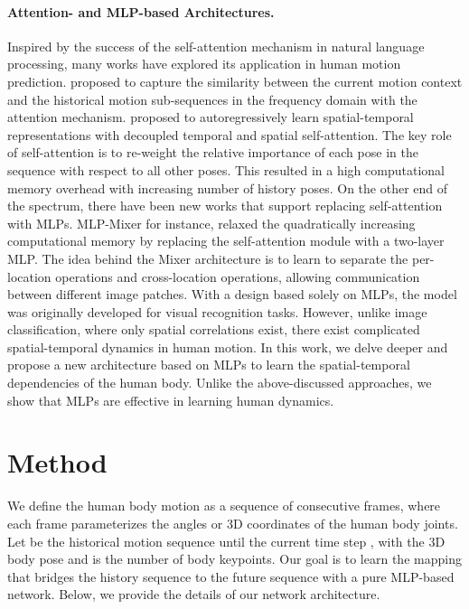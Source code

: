 \documentclass{article}
\begin{document}
\paragraph{Attention- and MLP-based Architectures.}
Inspired by the success of the self-attention mechanism \cite{vaswani2017attention} in natural language processing, many works have explored its application in human motion prediction. \cite{mao2020history} proposed to capture the similarity between the current motion context and the historical motion sub-sequences in the frequency domain with the attention mechanism. \cite{aksan2020spatio} proposed to autoregressively learn spatial-temporal representations with  decoupled temporal and spatial self-attention. The key role of self-attention is to re-weight the relative importance of each pose in the sequence with respect to all other poses. This resulted in a high computational memory overhead with increasing number of history poses. On the other end of the spectrum, there have been new works that support replacing self-attention with MLPs. MLP-Mixer  \cite{tolstikhin2021mlp} for instance, relaxed the quadratically increasing computational memory by replacing the self-attention module with a two-layer MLP. The idea behind the Mixer architecture is to learn to separate the per-location operations and cross-location operations, allowing communication between different image patches. With a design based solely on MLPs, the model was originally developed for visual recognition tasks. However, unlike image classification, where only spatial correlations exist, there exist complicated spatial-temporal dynamics in human motion. In this work, we delve deeper and propose a new architecture based on MLPs to learn the spatial-temporal dependencies of the human body. Unlike the above-discussed approaches, we show that MLPs are effective in learning human dynamics. 

\section {Method}

We define the human body motion as a sequence of  consecutive frames, where each frame parameterizes the angles or 3D coordinates of the human body joints. Let  be the historical motion sequence until the current time step , with the 3D body pose  and   is the number of body keypoints. Our goal is to learn the mapping that bridges the history sequence  to the future sequence   with a pure MLP-based network. Below, we provide the details of our network architecture.
\end{document}
